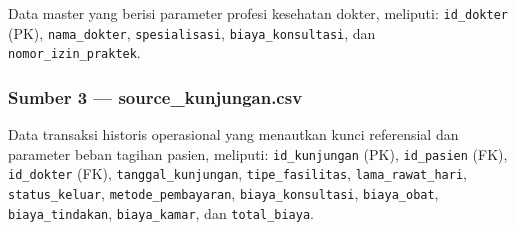 Data master yang berisi parameter profesi kesehatan dokter, meliputi: \texttt{id\_dokter} (PK), \texttt{nama\_dokter}, \texttt{spesialisasi}, \texttt{biaya\_konsultasi}, dan \texttt{nomor\_izin\_praktek}.
 
\subsubsection{Sumber 3 — source\_kunjungan.csv}
 
Data transaksi historis operasional yang menautkan kunci referensial dan parameter beban tagihan pasien, meliputi: \texttt{id\_kunjungan} (PK), \texttt{id\_pasien} (FK), \texttt{id\_dokter} (FK), \texttt{tanggal\_kunjungan}, \texttt{tipe\_fasilitas}, \texttt{lama\_rawat\_hari}, \texttt{status\_keluar}, \texttt{metode\_pembayaran}, \texttt{biaya\_konsultasi}, \texttt{biaya\_obat}, \texttt{biaya\_tindakan}, \texttt{biaya\_kamar}, dan \texttt{total\_biaya}.
 